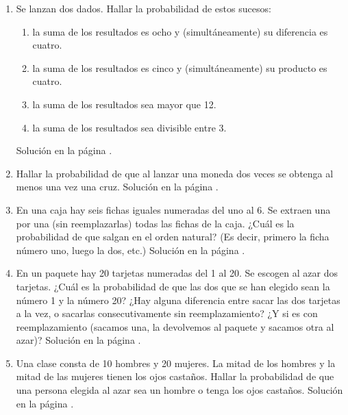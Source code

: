 \documentclass[10pt,a4paper]{article}\usepackage[]{graphicx}\usepackage[]{color}
\begin{document}
\begin{enumerate}
\addtocounter{enumi}{16}

\item \label{tut03:ejercicio17} Se lanzan dos dados. Hallar la probabilidad de estos sucesos:
\begin{enumerate}
     \item la suma de los resultados es ocho y (simultáneamente) su diferencia es cuatro.
     \item la suma de los resultados es cinco y (simultáneamente) su producto es cuatro.
     \item la suma de los resultados sea mayor que 12.
     \item la suma de los resultados sea divisible entre 3.
\end{enumerate}
Solución en la página \pageref{tut03:ejercicio17:sol}. 


\item  \label{tut03:ejercicio18} Hallar la probabilidad de que al lanzar una moneda dos veces se obtenga al menos una vez una cruz.
Solución en la página \pageref{tut03:ejercicio18:sol}. 


\item \label{tut03:ejercicio19} En una caja hay seis fichas iguales numeradas del uno al 6. Se extraen una por una (sin reemplazarlas) todas las fichas de la caja. ¿Cuál es la probabilidad de que salgan en el orden natural? (Es decir, primero la ficha número uno, luego la dos, etc.)     
Solución en la página \pageref{tut03:ejercicio19:sol}. 


     
\item  \label{tut03:ejercicio20} En un paquete hay 20 tarjetas numeradas del 1 al 20. Se escogen al azar dos tarjetas. ¿Cuál es la probabilidad de que las dos que se han elegido sean la número 1 y la número 20? ¿Hay alguna diferencia entre sacar las dos tarjetas a la vez, o sacarlas consecutivamente sin reemplazamiento? ¿Y si es con reemplazamiento (sacamos una, la devolvemos al paquete y sacamos otra al azar)?      
Solución en la página \pageref{tut03:ejercicio20:sol}.


\item  \label{tut03:ejercicio21} Una clase consta de 10 hombres y 20 mujeres. La mitad de los hombres y la mitad de las mujeres tienen los ojos castaños. Hallar la probabilidad de que una persona elegida al azar sea un hombre o tenga los ojos castaños. 
Solución en la página \pageref{tut03:ejercicio21:sol}. 


\end{enumerate}
\end{document}
